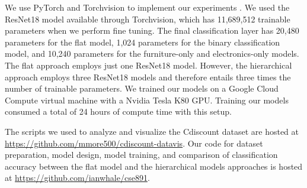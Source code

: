 We use PyTorch and Torchvision to implement our experiments \cite{paszke2017pytorch}.
We used the ResNet18 model available through Torchvision, which has 11,689,512 trainable parameters when we perform fine tuning.
The final classification layer has 20,480 parameters for the flat model, 1,024 parameters for the binary classification model, and 10,240 parameters for the furniture-only and electronics-only models.  
The flat approach employs just one ResNet18 model.
However, the hierarchical approach employs three ResNet18 models and therefore entails three times the number of trainable parameters. 
We trained our models on a Google Cloud Compute virtual machine with a Nvidia Tesla K80 GPU.
Training our models consumed a total of 24 hours of compute time with this setup.

The scripts we used to analyze and visualize the Cdiscount dataset are hosted at \url{https://github.com/mmore500/cdiscount-datavis}.
Our code for dataset preparation, model design, model training, and comparison of classification accuracy between the flat model and the hierarchical models approaches is hosted at \url{https://github.com/ianwhale/cse891}.
